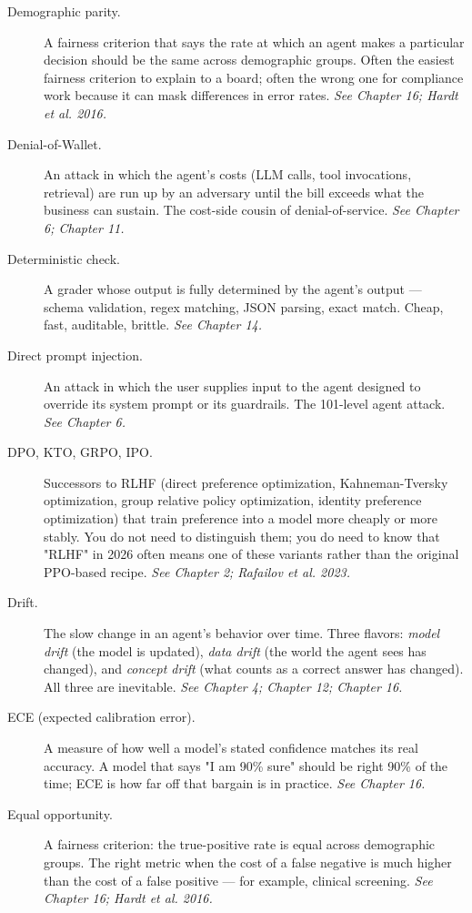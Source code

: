 \begin{description}
  \item[Demographic parity.] A fairness criterion that says the rate at which an agent makes a particular decision should be the same across demographic groups. Often the easiest fairness criterion to explain to a board; often the wrong one for compliance work because it can mask differences in error rates. \textit{See Chapter 16; Hardt et al. 2016.}
  \item[Denial-of-Wallet.] An attack in which the agent's costs (LLM calls, tool invocations, retrieval) are run up by an adversary until the bill exceeds what the business can sustain. The cost-side cousin of denial-of-service. \textit{See Chapter 6; Chapter 11.}
  \item[Deterministic check.] A grader whose output is fully determined by the agent's output — schema validation, regex matching, JSON parsing, exact match. Cheap, fast, auditable, brittle. \textit{See Chapter 14.}
  \item[Direct prompt injection.] An attack in which the user supplies input to the agent designed to override its system prompt or its guardrails. The 101-level agent attack. \textit{See Chapter 6.}
  \item[DPO, KTO, GRPO, IPO.] Successors to RLHF (direct preference optimization, Kahneman-Tversky optimization, group relative policy optimization, identity preference optimization) that train preference into a model more cheaply or more stably. You do not need to distinguish them; you do need to know that "RLHF" in 2026 often means one of these variants rather than the original PPO-based recipe. \textit{See Chapter 2; Rafailov et al. 2023.}
  \item[Drift.] The slow change in an agent's behavior over time. Three flavors: \textit{model drift} (the model is updated), \textit{data drift} (the world the agent sees has changed), and \textit{concept drift} (what counts as a correct answer has changed). All three are inevitable. \textit{See Chapter 4; Chapter 12; Chapter 16.}
  \item[ECE (expected calibration error).] A measure of how well a model's stated confidence matches its real accuracy. A model that says "I am 90\% sure" should be right 90\% of the time; ECE is how far off that bargain is in practice. \textit{See Chapter 16.}
  \item[Equal opportunity.] A fairness criterion: the true-positive rate is equal across demographic groups. The right metric when the cost of a false negative is much higher than the cost of a false positive — for example, clinical screening. \textit{See Chapter 16; Hardt et al. 2016.}

\end{description}
